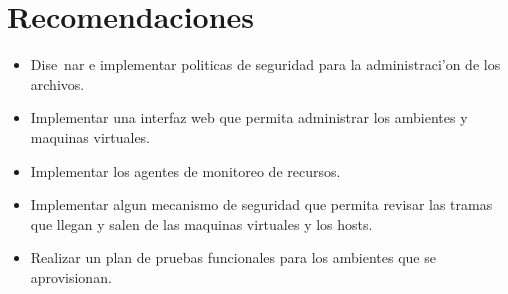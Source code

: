 \chapter{Recomendaciones}
\label{caprecomendaciones}

\begin{itemize}
\item Dise~nar e implementar politicas de seguridad para la administraci'on de los archivos.
\item Implementar una interfaz web que permita administrar los ambientes y maquinas virtuales.
\item Implementar los agentes de monitoreo de recursos.
\item Implementar algun mecanismo de seguridad que permita revisar las tramas que llegan y salen de las maquinas virtuales y los hosts.
\item Realizar un plan de pruebas funcionales para los ambientes que se aprovisionan.
\end{itemize}

